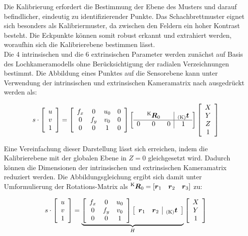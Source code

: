 Die Kalibrierung erfordert die Bestimmung der Ebene des Musters und darauf befindlicher, eindeutig zu identifizierender Punkte. Das Schachbrettmuster eignet sich besonders als Kalibriermuster, da zwischen den Feldern ein hoher Kontrast besteht. Die Eckpunkte können somit robust erkannt und extrahiert werden, woraufhin sich die Kalibrierebene bestimmen lässt. \\

Die 4 intrinsischen und die 6 extrinsischen Parameter werden zunächst auf Basis des Lochkameramodells ohne Berücksichtigung der radialen Verzeichnungen bestimmt. Die Abbildung eines Punktes auf die Sensorebene kann unter Verwendung der intrinsischen und extrinsischen Kameramatrix nach  ausgedrückt werden als:

\begin{equation}
s \cdot 
\mat{c}{
u\\
v\\
1
}
=
\mat{cccc}{
f_x & 0 & u_0 & 0\\
0 & f_y & v_0 & 0\\
0 & 0 & 1 & 0
}
\mat{ccc|c}{
  & \rmat{K}{0} &   & \ve{K}{t} \\
\hline
0 &      0      & 0 & 1 \\
}
\mat{c}{
X\\
Y\\
Z\\
1
}
\end{equation}

Eine Vereinfachung dieser Darstellung lässt sich erreichen, indem die Kalibrierebene mit der globalen Ebene in $Z=0$ gleichgesetzt wird. Dadurch können die Dimensionen der intrinsischen und extrinsischen Kameramatrix reduziert werden. Die Abbildungsgleichung ergibt sich damit unter Umformulierung der Rotations-Matrix als $\rmat{K}{0} = [\vec{r}_1 \quad \vec{r}_2 \quad \vec{r}_3]$ zu:

\begin{equation}
s \cdot
\mat{c}{
u\\
v\\
1
}
 = 
\underbrace{
\mat{ccc}{ 
	f_x & 0 & u_0\\
	0 & f_y & v_0\\
	0 & 0 & 1
}
\mat{cc|c}{ 
	\vec{r}_1 & \vec{r}_2 & \ve{K}{t} \\
}
}_H
\mat{c}{
	X\\
	Y\\
	1
}
\end{equation}

